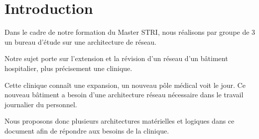 \section*{Introduction} %

%
%

Dans le cadre de notre formation du Master STRI, nous réalisons par groupe de 3 un bureau d'étude sur une architecture de réseau.

%

Notre sujet porte sur l'extension et la révision d'un réseau d'un bâtiment hospitalier, plus précisement une clinique.

%

Cette clinique connaît une expansion, un nouveau pôle médical voit le jour.
Ce nouveau bâtiment a besoin d'une architecture réseau nécessaire dans le travail journalier du personnel.

%

Nous proposons donc plusieurs architectures matérielles et logiques dans ce document afin de répondre aux besoins de la clinique.

%
%
